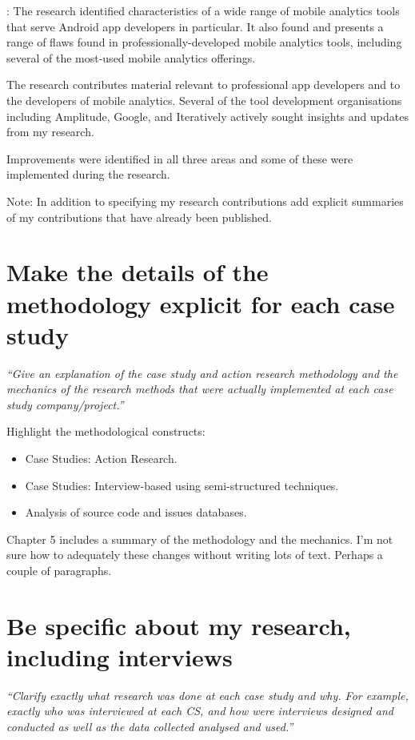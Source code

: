 :
The research identified characteristics of a wide range of mobile analytics tools that serve Android app developers in particular. It also found and  presents a range of flaws found in professionally-developed mobile analytics tools, including several of the most-used mobile analytics offerings.

The research contributes material relevant to professional app developers and to the developers of mobile analytics. Several of the tool development organisations including Amplitude, Google, and Iteratively actively sought insights and updates from my research.

Improvements were identified in all three areas and some of these were implemented during the research. 

Note: In addition to specifying my research contributions add explicit summaries of my contributions that have already been published.


\section{Make the details of the methodology explicit for each case study}
\emph{``Give an explanation of the case study and action research methodology and the mechanics of the research methods that were actually implemented at each case study company/project.''}

Highlight the methodological constructs:
\begin{itemize}
    \item Case Studies: Action Research.
    \item Case Studies: Interview-based using semi-structured techniques.
    \item Analysis of source code and issues databases.
\end{itemize}

Chapter 5 includes a summary of the methodology and the mechanics. I'm not sure how to adequately these changes without writing lots of text. Perhaps a couple of paragraphs.

\section{Be specific about my research, including interviews}
\emph{``Clarify exactly what research was done at each case study and why. For example, exactly who was interviewed at each CS, and how were interviews designed and conducted as well as the data collected analysed and used.''}


